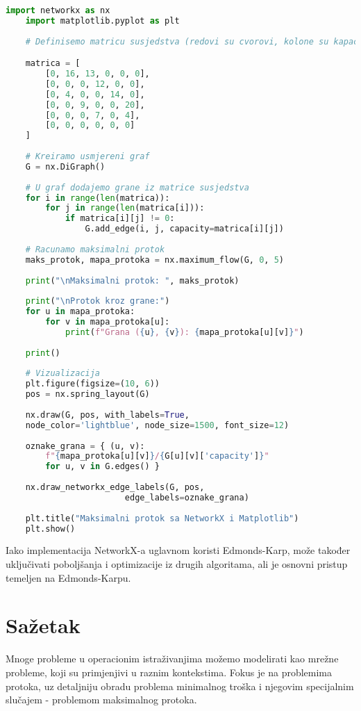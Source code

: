 \documentclass[11pt, a4paper]{article}
\begin{document}
	\newpage
	\begin{lstlisting}[language=Python]
	import networkx as nx
	import matplotlib.pyplot as plt
	
	# Definisemo matricu susjedstva (redovi su cvorovi, kolone su kapaciteti grana)

	matrica = [
		[0, 16, 13, 0, 0, 0],
		[0, 0, 0, 12, 0, 0],
		[0, 4, 0, 0, 14, 0],
		[0, 0, 9, 0, 0, 20],
		[0, 0, 0, 7, 0, 4],
		[0, 0, 0, 0, 0, 0]
	]
	
	# Kreiramo usmjereni graf
	G = nx.DiGraph()
	
	# U graf dodajemo grane iz matrice susjedstva
	for i in range(len(matrica)):
		for j in range(len(matrica[i])):
			if matrica[i][j] != 0:
				G.add_edge(i, j, capacity=matrica[i][j])
	
	# Racunamo maksimalni protok
	maks_protok, mapa_protoka = nx.maximum_flow(G, 0, 5)
	
	print("\nMaksimalni protok: ", maks_protok)
	
	print("\nProtok kroz grane:")
	for u in mapa_protoka:
		for v in mapa_protoka[u]:
			print(f"Grana ({u}, {v}): {mapa_protoka[u][v]}")
			
	print()
	
	# Vizualizacija
	plt.figure(figsize=(10, 6))
	pos = nx.spring_layout(G)
	
	nx.draw(G, pos, with_labels=True,
	node_color='lightblue', node_size=1500, font_size=12)
	
	oznake_grana = { (u, v):
		f"{mapa_protoka[u][v]}/{G[u][v]['capacity']}"
		for u, v in G.edges() }
	
	nx.draw_networkx_edge_labels(G, pos,
						edge_labels=oznake_grana)
	
	plt.title("Maksimalni protok sa NetworkX i Matplotlib")
	plt.show()
	\end{lstlisting}
	
	Iako implementacija NetworkX-a uglavnom koristi Edmonds-Karp, može također uključivati poboljšanja i optimizacije iz drugih algoritama, ali je osnovni pristup temeljen na Edmonds-Karpu.
	
	\newpage
	\section{Sažetak}
	
	Mnoge probleme u operacionim istraživanjima možemo modelirati kao mrežne probleme, koji su primjenjivi u raznim kontekstima. Fokus je na problemima protoka, uz detaljniju obradu problema minimalnog troška i njegovim specijalnim slučajem - problemom maksimalnog protoka.
	
\end{document}
